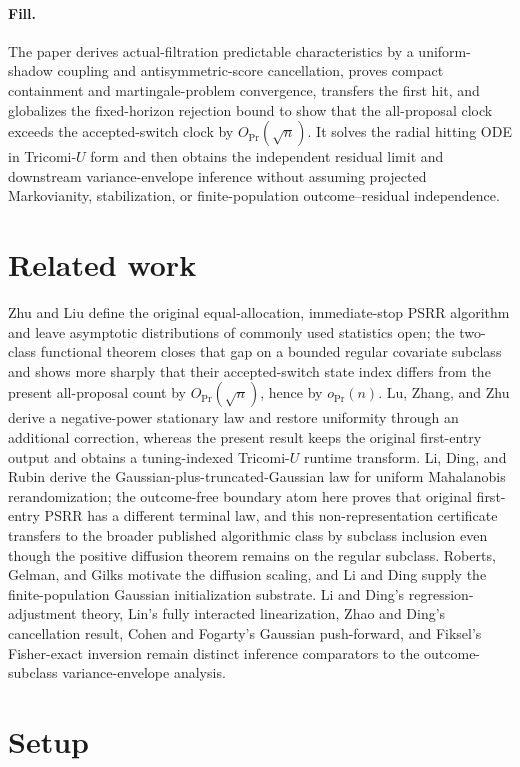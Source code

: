 \documentclass{article}
\begin{document}
\paragraph{Fill.} The paper derives actual-filtration predictable characteristics by a uniform-shadow coupling and antisymmetric-score cancellation, proves compact containment and martingale-problem convergence, transfers the first hit, and globalizes the fixed-horizon rejection bound to show that the all-proposal clock exceeds the accepted-switch clock by \(O_{\Pr}(\sqrt n)\). It solves the radial hitting ODE in Tricomi-\(U\) form and then obtains the independent residual limit and downstream variance-envelope inference without assuming projected Markovianity, stabilization, or finite-population outcome--residual independence.

\section{Related work}

Zhu and Liu define the original equal-allocation, immediate-stop PSRR algorithm and leave asymptotic distributions of commonly used statistics open; the two-class functional theorem closes that gap on a bounded regular covariate subclass and shows more sharply that their accepted-switch state index differs from the present all-proposal count by \(O_{\Pr}(\sqrt n)\), hence by \(o_{\Pr}(n)\). Lu, Zhang, and Zhu derive a negative-power stationary law and restore uniformity through an additional correction, whereas the present result keeps the original first-entry output and obtains a tuning-indexed Tricomi-\(U\) runtime transform. Li, Ding, and Rubin derive the Gaussian-plus-truncated-Gaussian law for uniform Mahalanobis rerandomization; the outcome-free boundary atom here proves that original first-entry PSRR has a different terminal law, and this non-representation certificate transfers to the broader published algorithmic class by subclass inclusion even though the positive diffusion theorem remains on the regular subclass. Roberts, Gelman, and Gilks motivate the diffusion scaling, and Li and Ding supply the finite-population Gaussian initialization substrate. Li and Ding's regression-adjustment theory, Lin's fully interacted linearization, Zhao and Ding's cancellation result, Cohen and Fogarty's Gaussian push-forward, and Fiksel's Fisher-exact inversion remain distinct inference comparators to the outcome-subclass variance-envelope analysis.

\section{Setup}
\end{document}
